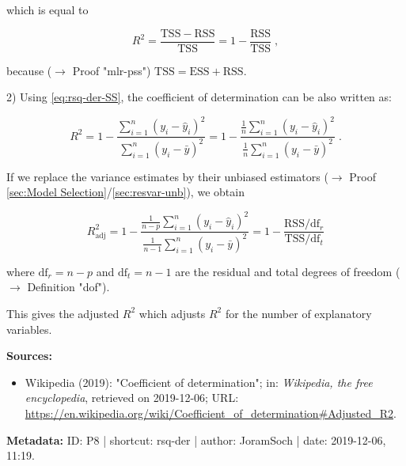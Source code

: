 \documentclass[a4paper,12pt]{book}
\begin{document}
which is equal to

\begin{equation} \label{eq:rsq-der-R2-s2}
R^2 = \frac{\mathrm{TSS}-\mathrm{RSS}}{\mathrm{TSS}} = 1 - \frac{\mathrm{RSS}}{\mathrm{TSS}} \; ,
\end{equation}

because ($\rightarrow$ Proof "mlr-pss") $\mathrm{TSS} = \mathrm{ESS} + \mathrm{RSS}$.

\vspace{1em}
2) Using \eqref{eq:rsq-der-SS}, the coefficient of determination can be also written as:

\begin{equation} \label{eq:rsq-der-R2'}
R^2 = 1 - \frac{\sum_{i=1}^{n} (y_i - \hat{y}_i)^2}{\sum_{i=1}^{n} (y_i - \bar{y})^2} = 1 - \frac{\frac{1}{n} \sum_{i=1}^{n} (y_i - \hat{y}_i)^2}{\frac{1}{n} \sum_{i=1}^{n} (y_i - \bar{y})^2} \; .
\end{equation}

If we replace the variance estimates by their unbiased estimators ($\rightarrow$ Proof \ref{sec:Model Selection}/\ref{sec:resvar-unb}), we obtain

\begin{equation} \label{eq:rsq-der-R2-adj'}
R^2_{\mathrm{adj}} = 1 - \frac{\frac{1}{n-p} \sum_{i=1}^{n} (y_i - \hat{y}_i)^2}{\frac{1}{n-1} \sum_{i=1}^{n} (y_i - \bar{y})^2} = 1 - \frac{\mathrm{RSS}/\mathrm{df}_r}{\mathrm{TSS}/\mathrm{df}_t}
\end{equation}

where $\mathrm{df}_r = n-p$ and $\mathrm{df}_t = n-1$ are the residual and total degrees of freedom ($\rightarrow$ Definition "dof").

\vspace{1em}
This gives the adjusted $R^2$ which adjusts $R^2$ for the number of explanatory variables.

\vspace{1em}
\textbf{Sources:}
\begin{itemize}
\item Wikipedia (2019): "Coefficient of determination"; in: \textit{Wikipedia, the free encyclopedia}, retrieved on 2019-12-06; URL: \url{https://en.wikipedia.org/wiki/Coefficient_of_determination#Adjusted_R2}.
\end{itemize}


\vspace{1em}
\textbf{Metadata:} ID: P8 | shortcut: rsq-der | author: JoramSoch | date: 2019-12-06, 11:19.
\end{document}
